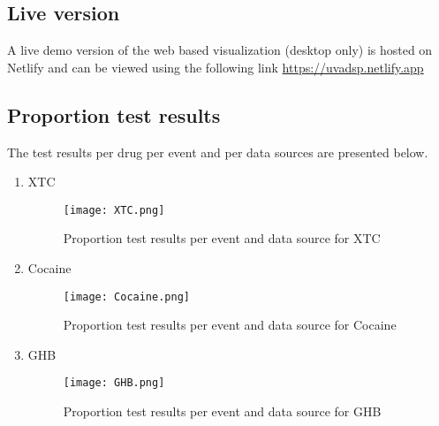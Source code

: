 \subsection{Live version}
A live demo version of the web based visualization (desktop only) is hosted on Netlify and can be viewed using the following link \underline{https://uvadsp.netlify.app}

\subsection{Proportion test results}
The test results per drug per event and per data sources are presented below. 
\begin{enumerate}
    \item XTC
        \begin{figure*}[!htbp]
            \texttt{[image: XTC.png]}
            \caption{Proportion test results per event and data source for XTC}
            \label{fig:XTC}
        \end{figure*}
    \item Cocaine
        \begin{figure*}[!htbp]
            \texttt{[image: Cocaine.png]}
            \caption{Proportion test results per event and data source for Cocaine}
            \label{fig:Cocaine}
        \end{figure*}
    \item GHB
            \begin{figure*}[!htbp]
            \texttt{[image: GHB.png]}
            \caption{Proportion test results per event and data source for GHB}
            \label{fig:Cocaine}
        \end{figure*}
\end{enumerate}